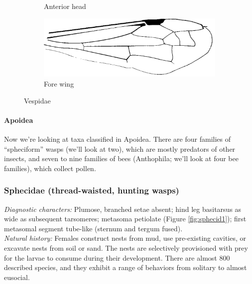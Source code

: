 \documentclass[letterpaper, 11pt]{article}
\begin{document}
\begin{figure}[ht!]
\begin{subfigure}[ht!]{0.2\textwidth}
        \caption{Anterior head \citep[][pg. 214]{goulet1993hymenoptera}}
        \label{fig:vespid2}
    \end{subfigure}
    \hfill
    \begin{subfigure}[ht!]{0.45\textwidth}
        \includegraphics[width=\textwidth]{VespidWing}
        \caption{Fore wing \citep[][pg. 214]{goulet1993hymenoptera}}
        \label{fig:vespid3}
    \end{subfigure}
    \caption{Vespidae}\label{fig:vespids}
\end{figure}
\FloatBarrier

\paragraph*{Apoidea} Now we're looking at taxa classified in Apoidea. There are four families of ``spheciform'' wasps (we'll look at two), which are mostly predators of other insects, and seven to nine families of bees (Anthophila; we'll look at four bee families), which collect pollen. \\

\subsubsection{Sphecidae (thread-waisted, hunting wasps)}
\noindent{}\textit{Diagnostic characters:} Plumose, branched setae absent; hind leg basitarsus as wide as subsequent tarsomeres; metasoma petiolate (Figure \ref{fig:sphecid1}); first metasomal segment tube-like (sternum and tergum fused).\\

\noindent{}\textit{Natural history:} Females construct nests from mud, use pre-existing cavities, or excavate nests from soil or sand. The nests are selectively provisioned with prey for the larvae to consume during their development. There are almost 800 described species, and they exhibit a range of behaviors from solitary to almost eusocial.\\
\end{document}
